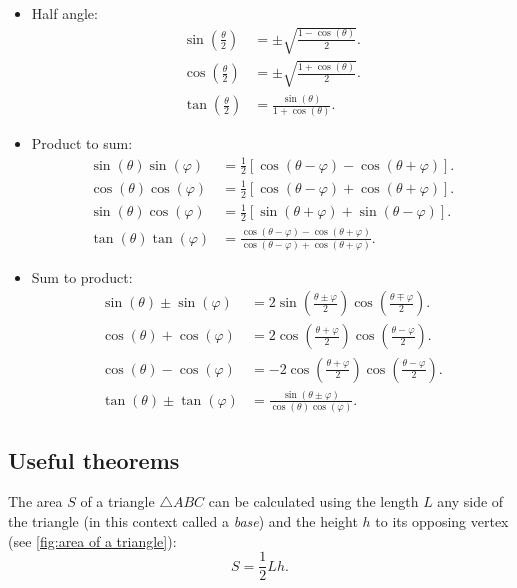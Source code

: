 \begin{itemize}
	\item Half angle:
		\begin{align}
			\sin\left( \frac{\theta}{2} \right) &= \pm\sqrt{\frac{1-\cos(\theta)}{2}}.\\
			\cos\left( \frac{\theta}{2} \right) &= \pm\sqrt{\frac{1+\cos(\theta)}{2}}.\\
			\tan\left( \frac{\theta}{2} \right) &= \frac{\sin(\theta)}{1+\cos(\theta)}.
		\end{align}
	
	\item Product to sum:
		\begin{align}
			\sin(\theta)\sin(\varphi) &= \frac{1}{2}\left[ \cos(\theta-\varphi)-\cos(\theta+\varphi) \right].\\
			\cos(\theta)\cos(\varphi) &= \frac{1}{2}\left[ \cos(\theta-\varphi)+\cos(\theta+\varphi) \right].\\
			\sin(\theta)\cos(\varphi) &= \frac{1}{2}\left[ \sin(\theta+\varphi) + \sin(\theta-\varphi) \right].\\
			\tan(\theta)\tan(\varphi) &= \frac{\cos(\theta-\varphi)-\cos(\theta+\varphi)}{\cos(\theta-\varphi)+\cos(\theta+\varphi)}.
			\label{eq:trig product to sum}
		\end{align}

	\item Sum to product:
		\begin{align}
			\sin(\theta)\pm\sin(\varphi) &= 2\sin\left( \frac{\theta\pm\varphi}{2} \right)\cos\left( \frac{\theta\mp\varphi}{2} \right).\\
			\cos(\theta)+\cos(\varphi) &= 2\cos\left( \frac{\theta+\varphi}{2} \right)\cos\left( \frac{\theta-\varphi}{2} \right).\\
			\cos(\theta)-\cos(\varphi) &= -2\cos\left( \frac{\theta+\varphi}{2} \right)\cos\left( \frac{\theta-\varphi}{2} \right).\\
			\tan(\theta)\pm\tan(\varphi) &= \frac{\sin(\theta\pm\varphi)}{\cos(\theta)\cos(\varphi)}.
			\label{eq:trig sum to product}
		\end{align}
\end{itemize}

\subsection{Useful theorems}
The area $S$ of a triangle $\triangle ABC$ can be calculated using the length $L$ any side of the triangle (in this context called a \emph{base}) and the height $h$ to its opposing vertex (see \autoref{fig:area of a triangle}):
\begin{equation}
	S = \frac{1}{2}Lh.
	\label{eq:area of a triangle}
\end{equation}

